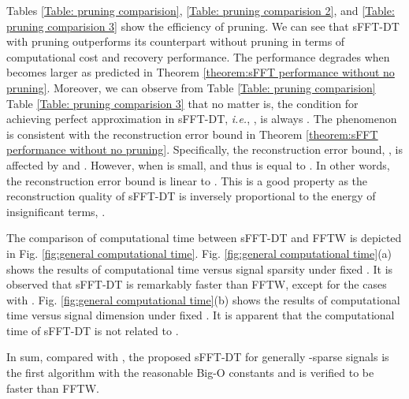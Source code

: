 \documentclass[journal,onecolumn,11pt]{IEEEtran}
\begin{document}
Tables \ref{Table: pruning comparision}, \ref{Table: pruning comparision 2}, and \ref{Table: pruning comparision 3}  show the efficiency of pruning.
We can see that sFFT-DT with pruning outperforms its counterpart without pruning in terms of computational cost and recovery performance.
The performance degrades when  becomes larger as predicted in Theorem \ref{theorem:sFFT performance without no pruning}.
Moreover, we can observe from Table \ref{Table: pruning comparision}  Table \ref{Table: pruning comparision 3} that  no matter  is, the condition for achieving perfect approximation in sFFT-DT, {\em i.e.}, , is always .
The phenomenon is consistent with the reconstruction error bound in Theorem \ref{theorem:sFFT performance without no pruning}. Specifically, the reconstruction error bound, , is affected by  and  .
However, when  is small,  and thus  is equal to .
In other words, the reconstruction error bound is linear to .
This is a good property as the reconstruction quality of sFFT-DT is inversely proportional to the energy of insignificant terms, .

The comparison of computational time between sFFT-DT and FFTW is depicted in Fig. \ref{fig:general computational time}.
Fig. \ref{fig:general computational time}(a) shows the results of computational time versus signal sparsity under fixed .
It is observed that sFFT-DT is remarkably faster than FFTW, except for the cases with .
Fig. \ref{fig:general computational time}(b) shows the results of computational time versus signal dimension under fixed .
It is apparent that the computational time of sFFT-DT is not related to .

In sum, compared with \cite{Haitham2012}\cite{Haitham2012_1}, the proposed sFFT-DT for generally -sparse signals is the first algorithm with the reasonable Big-O constants and is verified to be faster than FFTW.
\end{document}
